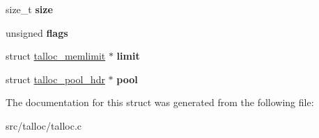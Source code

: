 \begin{DoxyCompactItemize}
\item 
\hypertarget{structtalloc__chunk_adfeec7becd5c06c364ea425da1624189}{}size\+\_\+t {\bfseries size}\label{structtalloc__chunk_adfeec7becd5c06c364ea425da1624189}

\item 
\hypertarget{structtalloc__chunk_af7f2731217b57a4cf070d0f2b5519ce2}{}unsigned {\bfseries flags}\label{structtalloc__chunk_af7f2731217b57a4cf070d0f2b5519ce2}

\item 
\hypertarget{structtalloc__chunk_a45b61470e324346c647f1ddfccd5bab0}{}struct \hyperlink{structtalloc__memlimit}{talloc\+\_\+memlimit} $\ast$ {\bfseries limit}\label{structtalloc__chunk_a45b61470e324346c647f1ddfccd5bab0}

\item 
\hypertarget{structtalloc__chunk_a523ed1fbb31f0a6a5e518d8268dea851}{}struct \hyperlink{structtalloc__pool__hdr}{talloc\+\_\+pool\+\_\+hdr} $\ast$ {\bfseries pool}\label{structtalloc__chunk_a523ed1fbb31f0a6a5e518d8268dea851}

\end{DoxyCompactItemize}


The documentation for this struct was generated from the following file\+:\begin{DoxyCompactItemize}
\item 
src/talloc/talloc.\+c\end{DoxyCompactItemize}
